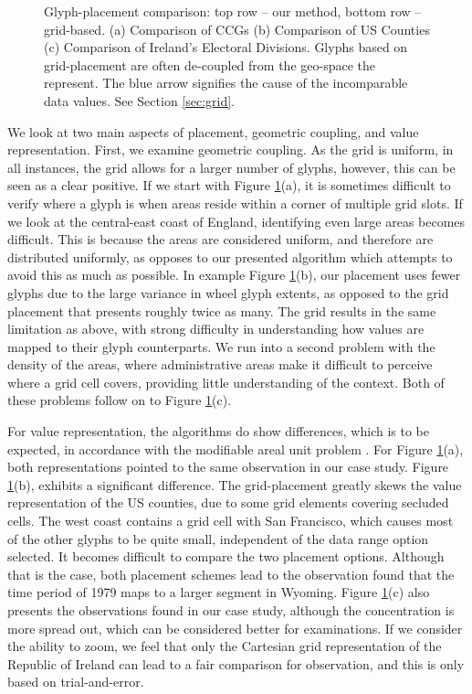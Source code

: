 \begin{figure}
\caption{Glyph-placement comparison: top row -- our method, bottom row -- grid-based. (a) Comparison of CCGs (b) Comparison of US Counties (c) Comparison of Ireland's Electoral Divisions. Glyphs based on grid-placement are often de-coupled from the geo-space the represent. The blue arrow signifies the cause of the incomparable data values. See Section \ref{sec:grid}.
} \label{fig:compare} \label{fig:grid}
\end{figure}

We look at two main aspects of placement, geometric coupling, and value representation. First, we examine geometric coupling. As the grid is uniform, in all instances, the grid allows for a larger number of glyphs, however, this can be seen as a clear positive. If we start with Figure \ref{fig:grid}(a), it is sometimes difficult to verify where a glyph is when areas reside within a corner of multiple grid slots. If we look at the central-east coast of England, identifying even large areas becomes difficult. This is because the areas are considered uniform, and therefore are distributed uniformly, as opposes to our presented algorithm which attempts to avoid this as much as possible.  In example Figure \ref{fig:grid}(b), our placement uses fewer glyphs due to the large variance in wheel glyph extents, as opposed to the grid placement that presents roughly twice as many. The grid results in the same limitation as above, with strong difficulty in understanding how values are mapped to their glyph counterparts. We run into a second problem with the density of the areas, where administrative areas make it difficult to perceive where a grid cell covers, providing little understanding of the context. Both of these problems follow on to Figure \ref{fig:grid}(c).

For value representation, the algorithms do show differences, which is to be expected, in accordance with the modifiable areal unit problem \cite{openshaw1984modifiable}. For Figure \ref{fig:grid}(a), both representations pointed to the same observation in our case study. Figure \ref{fig:grid}(b), exhibits a significant difference. The grid-placement greatly skews the value representation of the US counties, due to some grid elements covering secluded cells. The west coast contains a grid cell with San Francisco, which causes most of the other glyphs to be quite small, independent of the data range option selected. It becomes difficult to compare the two placement options. Although that is the case, both placement schemes lead to the observation found that the time period of 1979 maps to a larger segment in Wyoming. Figure \ref{fig:grid}(c) also presents the observations found in our case study, although the concentration is more spread out, which can be considered better for examinations. If we consider the ability to zoom, we feel that only the Cartesian grid representation of the Republic of Ireland can lead to a fair comparison for observation, and this is only based on trial-and-error.


